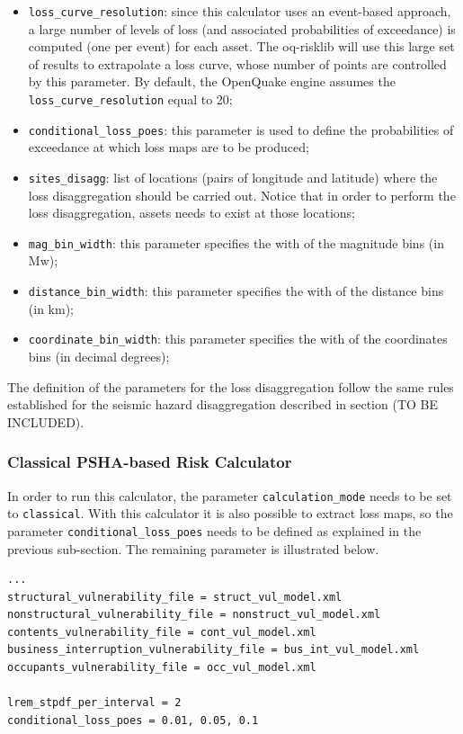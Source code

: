 \begin{itemize}
\item \Verb+loss_curve_resolution+: since this calculator uses an event\--based ap\-proach, a large number of levels of loss (and associated probabilities of exceedance) is computed (one per event) for each asset. The oq-risklib will use this large set of results to extrapolate a loss curve, whose number of points are controlled by this parameter. By default, the OpenQuake engine assumes the \Verb+loss_curve_resolution+ equal to 20;
\item  \Verb+conditional_loss_poes+: this parameter is used to define the probabilities of exceedance at which loss maps are to be produced;
\item  \Verb+sites_disagg+: list of locations (pairs of longitude and latitude) where the loss disaggregation should be carried out. Notice that in order to perform the loss disaggregation, assets needs to exist at those locations;
\item  \Verb+mag_bin_width+: this parameter specifies the with of the magnitude bins (in Mw);
\item  \Verb+distance_bin_width+: this parameter specifies the with of the distance bins (in km);
\item  \Verb+coordinate_bin_width+: this parameter specifies the with of the coordinates bins (in decimal degrees);
\end{itemize}

The definition of the parameters for the loss disaggregation follow the same rules established for the seismic hazard disaggregation described in section (TO BE INCLUDED).

\subsubsection{Classical PSHA-based Risk Calculator}
In order to run this calculator, the parameter \Verb+calculation_mode+ needs to be set to \Verb+classical+. With this calculator it is also possible to extract loss maps, so the parameter \Verb+conditional_loss_poes+ needs to be defined as explained in the previous sub-section. The remaining parameter is illustrated below.
\begin{Verbatim}[frame=single, commandchars=\\\{\}, samepage=true]
...
structural_vulnerability_file = struct_vul_model.xml
nonstructural_vulnerability_file = nonstruct_vul_model.xml
contents_vulnerability_file = cont_vul_model.xml
business_interruption_vulnerability_file = bus_int_vul_model.xml
occupants_vulnerability_file = occ_vul_model.xml

lrem_stpdf_per_interval = 2
conditional_loss_poes = 0.01, 0.05, 0.1
\end{Verbatim}

